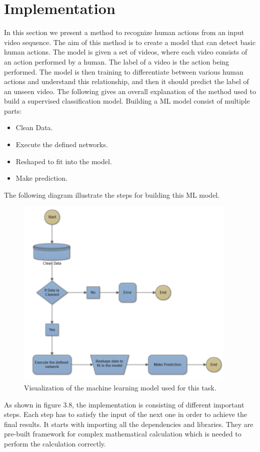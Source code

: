 \section{Implementation}
\hspace{5mm} In this section we present a method to recognize human actions from an input video sequence. The aim of this method is to create a model that can detect basic human actions. The model is given a set of videos, where each video consists of an action performed by a human. The label of a video is the action being performed. The model is then training to differentiate between various human actions and understand this relationship, and then it should predict the label of an unseen video. The following gives an overall explanation of the method used to build a supervised classification model. Building a ML model consist of multiple parts:
\begin{itemize}
\item Clean Data.
\item Execute the defined networks.
\item Reshaped to fit into the model. 
\item Make prediction.
\end{itemize}

The following diagram illustrate the steps for building this ML model.\\
\begin{figure}[ht]
\centering
\includegraphics{Figures/m}
\decoRule
\caption[Visualization of the machine learning model used for this task.]{Visualization of the machine learning model used for this task.}
\label{fig:la}
\end{figure}
\newpage
As shown in figure 3.8, the implementation is consisting of different important steps. Each step has to satisfy the input of the next one in order to achieve the final results. It starts with importing all the dependencies and libraries. They are pre-built framework for complex mathematical calculation which is needed to perform the calculation correctly.\\

